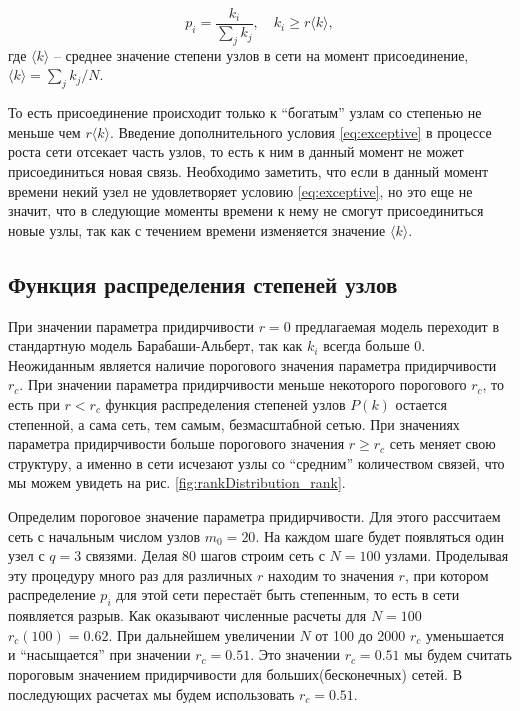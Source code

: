 \documentclass[10pt,aps,pra]{revtex4-1}
\begin{document}
            \begin{equation}\label{eq:exceptive}
                p_i = \frac{k_i}{\sum\limits_{j} k_j},\quad k_i \geq r \langle k \rangle,
            \end{equation}
                где $\langle k \rangle$ – среднее значение степени узлов в сети на момент присоединение, $\langle k \rangle = \sum\limits_{j}{k_j}/{N}$.

        То есть присоединение происходит только к ``богатым'' узлам со степенью не меньше чем $r\langle k \rangle$. Введение дополнительного условия \eqref{eq:exceptive} в процессе роста сети отсекает часть узлов, то есть к ним в данный момент не может присоединиться новая связь. Необходимо заметить, что если в данный момент времени некий узел не удовлетворяет условию \eqref{eq:exceptive}, но это еще не значит, что в следующие моменты времени к нему не смогут присоединиться новые узлы, так как с течением времени изменяется значение $\langle k \rangle$.

    \subsection{Функция распределения степеней узлов}

        При значении параметра придирчивости $r=0$ предлагаемая модель переходит в стандартную модель Барабаши-Альберт, так как $k_i$ всегда больше 0. Неожиданным является наличие порогового значения параметра придирчивости $r_c$. При значении параметра придирчивости меньше некоторого порогового $r_c$, то есть при $r<r_c$ функция распределения степеней узлов $P(k)$ остается степенной, а сама сеть, тем самым, безмасштабной сетью. При значениях параметра придирчивости больше порогового значения $r \geq r_c$ сеть меняет свою структуру, а именно в сети исчезают узлы со ``средним'' количеством связей, что мы можем увидеть на рис. \ref{fig:rankDistribution_rank}. 

        Определим пороговое значение параметра придирчивости. Для этого рассчитаем сеть с начальным числом узлов $m_0 = 20$. На каждом шаге будет появляться один узел с $q=3$ связями. Делая 80 шагов строим сеть с $N=100$ узлами. Проделывая эту процедуру много раз для различных $r$ находим то значения $r$, при котором распределение $p_i$ для этой сети перестаёт быть степенным, то есть в сети появляется разрыв. Как оказывают численные расчеты для $N=100$ $r_c(100) = 0.62$. При дальнейшем увеличении $N$ от 100 до 2000 $r_c$ уменьшается и ``насыщается'' при значении $r_c=0.51$. Это значении $r_c=0.51$ мы будем считать пороговым значением придирчивости для больших(бесконечных) сетей. В последующих расчетах мы будем использовать $r_c=0.51$.
\end{document}
